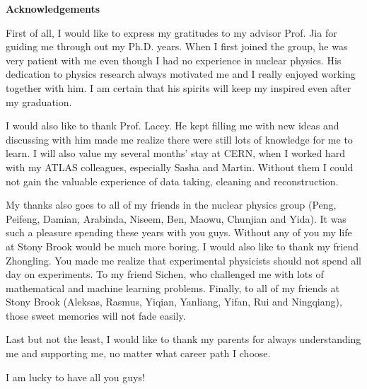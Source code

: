 \documentclass[12pt]{article}
\begin{document}
\newpage
\centerline{\bf{Acknowledgements}}
\vspace*{4\baselineskip}
First of all, I would like to express my gratitudes to my advisor Prof. Jia for guiding me through out my Ph.D. years. When I first joined the group, he was very patient with me even though I had no experience in nuclear physics. His dedication to physics research always motivated me and I really enjoyed working together with him. I am certain that his spirits will keep my inspired even after my graduation.

I would also like to thank Prof. Lacey. He kept filling me with new ideas and discussing with him made me realize there were still lots of knowledge for me to learn. I will also value my several months' stay at CERN, when I worked hard with my ATLAS colleagues, especially Sasha and Martin. Without them I could not gain the valuable experience of data taking, cleaning and reconstruction.

My thanks also goes to all of my friends in the nuclear physics group (Peng, Peifeng, Damian, Arabinda, Niseem, Ben, Maowu, Chunjian and Yida). It was such a pleasure spending these years with you guys. Without any of you my life at Stony Brook would be much more boring. I would also like to thank my friend Zhongling. You made me realize that experimental physicists should not spend all day on experiments. To my friend Sichen, who challenged me with lots of mathematical and machine learning problems. Finally, to all of my friends at Stony Brook (Aleksas, Rasmus, Yiqian, Yanliang, Yifan, Rui and Ningqiang), those sweet memories will not fade easily.

Last but not the least, I would like to thank my parents for always understanding me and supporting me, no matter what career path I choose.

I am lucky to have all you guys!
\end{document}
